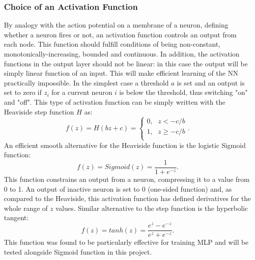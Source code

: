 \documentclass{emulateapj}
\begin{document}
\subsubsection{Choice of an Activation Function}
\label{subsubsec: activation function}

By analogy with the action potential on a membrane of a neuron, defining whether a neuron fires or not, an activation function controls an output from each node. This function should fulfill conditions of being non-constant, monotonically-increasing, bounded and continuous. In addition, the activation functions in the output layer should not be linear: in this case the output will be simply linear function of an input. This will make efficient learning of the NN practically impossible. In the simplest case a threshold $a$ is set and an output is set to zero if $z_i$ for a current neuron $i$ is below the threshold, thus switching "on" and "off". This type of activation function can be simply written with the Heaviside step function $H$ as:
\begin{equation}\label{eq:heaviside}
    f(z)=H(bz+c)=\begin{cases}
               0, \mbox{ }z<-c/b\\
               1, \mbox{ } z\geq -c/b\\
            \end{cases}.
\end{equation}
An efficient smooth alternative for the Heaviside function is the logistic Sigmoid function:
\begin{equation}
    f(z) = Sigmoid(z)=\frac{1}{1+e^{-z}}.
\end{equation}
This function constrains an output from a neuron, compressing it to a value from 0 to 1. An output of inactive neuron is set to 0 (one-sided function) and, as compared to the Heaviside, this activation function has defined derivatives for the whole range of $z$ values. Similar alternative to the step function is the hyperbolic tangent:
\begin{equation}
    f(z)=tanh(z)=\frac{e^z-e^{-z}}{e^z+e^{-z}}.
\end{equation}
This function was found to be particularly effective for training MLP and will be tested alongside Sigmoid function in this project. 
\end{document}
